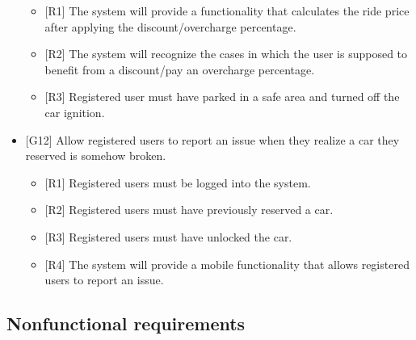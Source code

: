 \begin{itemize}
	\begin{itemize}
		\item {[R1]} The system will provide a functionality that calculates the ride price after applying the discount/overcharge percentage.
		\item {[R2]} The system will recognize the cases in which the user is supposed to benefit from a discount/pay an overcharge percentage.
		\item {[R3]} Registered user must have parked in a safe area and turned off the car ignition.
	\end{itemize}
	\item {[G12]} Allow registered users to report an issue when they realize a car they reserved is somehow broken.
	\begin{itemize}
		\item {[R1]} Registered users must be logged into the system.
		\item {[R2]} Registered users must have previously reserved a car.
		\item {[R3]} Registered users must have unlocked the car.
		\item {[R4]} The system will provide a mobile functionality that allows registered users to report an issue.
	\end{itemize}
\end{itemize}
\subsection{Nonfunctional requirements}
